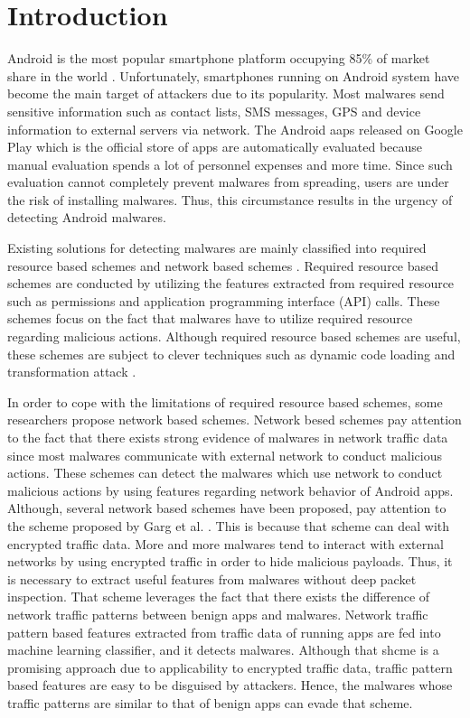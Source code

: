 \chapter{Introduction}\label{Sec:Introduction}

Android is the most popular smartphone platform occupying 85\% of market share in the world \cite{share}.
Unfortunately, smartphones running on Android system have become the main target of attackers due to its popularity.
Most malwares send sensitive information such as contact lists, SMS messages, GPS and device information to external servers via network. 
The Android aaps released on Google Play which is the official store of apps are automatically evaluated because manual evaluation spends a lot of personnel expenses and more time.
Since such evaluation cannot completely prevent malwares from spreading, users are under the risk of installing malwares.
Thus, this circumstance results in the urgency of detecting Android malwares.

Existing solutions for detecting malwares are mainly classified into required resource based schemes \cite{enck2009lightweight, deshotels2014droidlegacy, xu2016iccdetector, sun2017monet} and network based schemes \cite{wang2018detecting, garg2017network}.
Required resource based schemes are conducted by utilizing the features extracted from required resource such as permissions and application programming interface (API) calls.
These schemes focus on the fact that malwares have to utilize required resource regarding malicious actions.
Although required resource based schemes are useful, these schemes are subject to clever techniques such as dynamic code loading \cite{arora2018ntpdroid} and transformation attack \cite{zheng2012adam} \cite{rastogi2013droidchameleon}.

In order to cope with the limitations of required resource based schemes, some researchers propose network based schemes.
Network besed schemes pay attention to the fact that there exists strong evidence of malwares in network traffic data since most malwares communicate with external network to conduct malicious actions.
These schemes can detect the malwares which use network to conduct malicious actions by using features regarding network behavior of Android apps.
Although, several network based schemes have been proposed, \we pay attention to the scheme proposed by Garg et al. \cite{garg2017network}.
This is because that scheme can deal with encrypted traffic data.
More and more malwares tend to interact with external networks by using encrypted traffic in order to hide malicious payloads.
Thus, it is necessary to extract useful features from malwares without deep packet inspection.
That scheme leverages the fact that there exists the difference of network traffic patterns between benign apps and malwares.
Network traffic pattern based features extracted from traffic data of running apps are fed into machine learning classifier, and it detects malwares.
Although that shcme is a promising approach due to applicability to encrypted traffic data, traffic pattern based features are easy to be disguised by attackers.
Hence, the malwares whose traffic patterns are similar to that of benign apps can evade that scheme.

